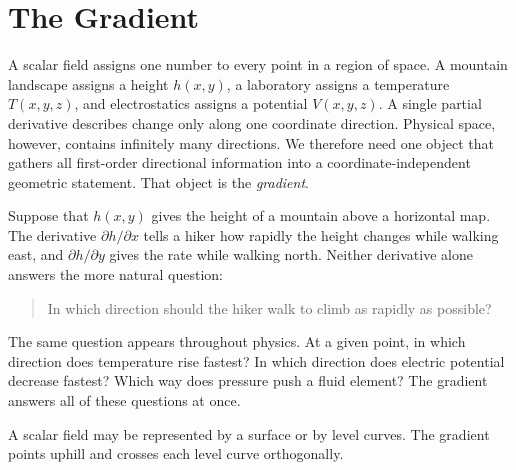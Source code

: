 \section{The Gradient}
\label{sec:gradient}

A scalar field assigns one number to every point in a region of space. A mountain landscape assigns a height $h(x,y)$, a laboratory assigns a temperature $T(x,y,z)$, and electrostatics assigns a potential $V(x,y,z)$. A single partial derivative describes change only along one coordinate direction. Physical space, however, contains infinitely many directions. We therefore need one object that gathers all first-order directional information into a coordinate-independent geometric statement. That object is the \emph{gradient}.


Suppose that $h(x,y)$ gives the height of a mountain above a horizontal map. The derivative $\partial h/\partial x$ tells a hiker how rapidly the height changes while walking east, and $\partial h/\partial y$ gives the rate while walking north. Neither derivative alone answers the more natural question:

\begin{quote}
In which direction should the hiker walk to climb as rapidly as possible?
\end{quote}

The same question appears throughout physics. At a given point, in which direction does temperature rise fastest? In which direction does electric potential decrease fastest? Which way does pressure push a fluid element? The gradient answers all of these questions at once.

\begin{bookfigure}{A scalar field may be represented by a surface or by level curves. The gradient points uphill and crosses each level curve orthogonally.}
\label{fig:gradient-mountain}
\end{bookfigure}


